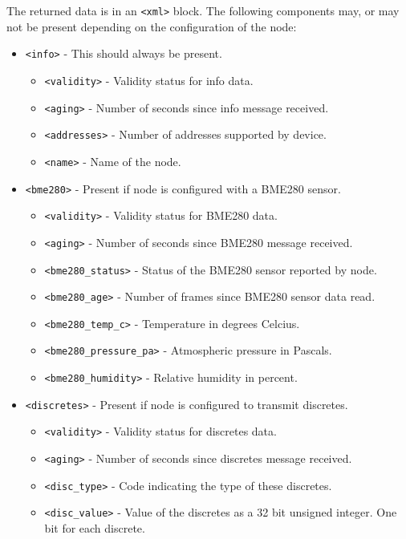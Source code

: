 \documentclass[10pt, openany, draft]{article}
\begin{document}
The returned data is in an \texttt{<xml>} block.  The following components may, or may not be present depending on the configuration of the node:
\begin{itemize}
  \item \texttt{<info>} - This should always be present.
  \begin{itemize}
    \item \texttt{<validity>} - Validity status for info data.
    \item \texttt{<aging>} - Number of seconds since info message received.
    \item \texttt{<addresses>} - Number of addresses supported by device.
    \item \texttt{<name>} - Name of the node.
  \end{itemize}
  \item \texttt{<bme280>} - Present if node is configured with a BME280 sensor.
  \begin{itemize}
    \item \texttt{<validity>} - Validity status for BME280 data.
    \item \texttt{<aging>} - Number of seconds since BME280 message received.
    \item \texttt{<bme280\_status>} - Status of the BME280 sensor reported by node.
    \item \texttt{<bme280\_age>} - Number of frames since BME280 sensor data read.
    \item \texttt{<bme280\_temp\_c>} - Temperature in degrees Celcius.
    \item \texttt{<bme280\_pressure\_pa>} - Atmospheric pressure in Pascals.
    \item \texttt{<bme280\_humidity>} - Relative humidity in percent.
  \end{itemize}
  \item \texttt{<discretes>} - Present if node is configured to transmit discretes.
  \begin{itemize}
    \item \texttt{<validity>} - Validity status for discretes data.
    \item \texttt{<aging>} - Number of seconds since discretes message received.
    \item \texttt{<disc\_type>} - Code indicating the type of these discretes.
    \item \texttt{<disc\_value>} - Value of the discretes as a 32 bit unsigned integer.  One bit for each discrete.
  \end{itemize}

\end{itemize}
\end{document}

